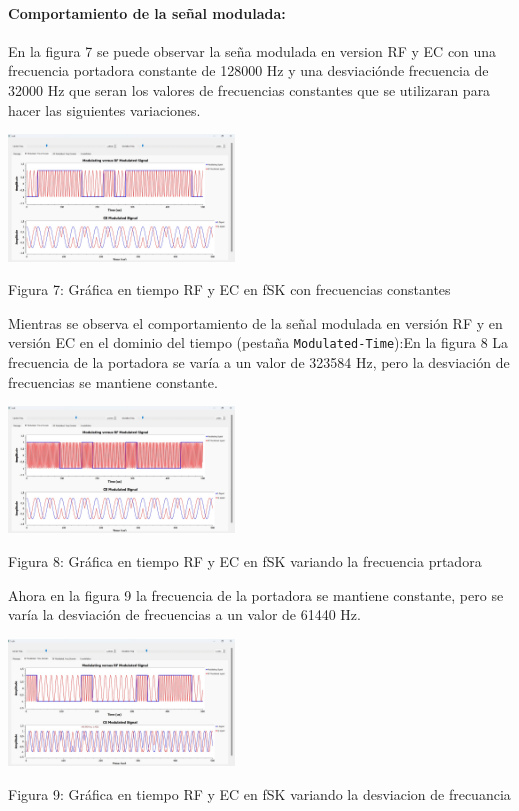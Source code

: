 \documentclass{journal}[IEEEtran, twocolumn]             %
\begin{document}
\begin{multicols}{2}
{\paragraph{Comportamiento de la señal modulada:}
En la figura 7 se puede observar la seña modulada en version RF y EC con una frecuencia portadora constante de 128000 Hz y una desviaciónde frecuencia de 32000 Hz que seran los valores de frecuencias constantes que se utilizaran para hacer las siguientes variaciones.
 \begin{center}
        \includegraphics[width=0.45\textwidth]{figs/F7.png}
        \caption{Figura 7: Gráfica en tiempo RF y EC en fSK con frecuencias constantes}
        \label{fig:7}
    \end{center}
Mientras se observa el comportamiento de la señal modulada en versión RF y en versión EC en el dominio del tiempo (pestaña \texttt{Modulated-Time}):En la figura 8 La frecuencia de la portadora se varía a un valor de 323584 Hz, pero la desviación de frecuencias se mantiene constante.
 \begin{center}
        \includegraphics[width=0.45\textwidth]{figs/F8.png}
        \caption{Figura 8: Gráfica en tiempo RF y EC en fSK variando la frecuencia prtadora}
        \label{fig:8}
    \end{center}
Ahora en la figura 9 la frecuencia de la portadora se mantiene constante, pero se varía la desviación de frecuencias a un valor de 61440 Hz.
 \begin{center}
        \includegraphics[width=0.45\textwidth]{figs/F9.png}
        \caption{Figura 9: Gráfica en tiempo RF y EC en fSK variando la desviacion de frecuancia}
        \label{fig:9}
    \end{center}
}
\end{multicols}
\end{document}
